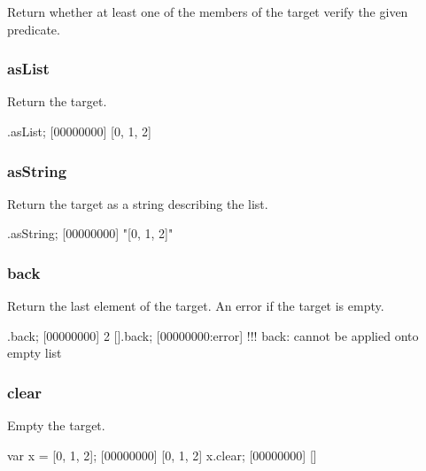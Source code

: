 Return whether at least one of the members of the target verify the
given predicate.


\subsubsection{asList}

Return the target.

\begin{urbiscript}
[0, 1, 2].asList;
[00000000] [0, 1, 2]
\end{urbiscript}

\subsubsection{asString}

Return the target as a string describing the list.

\begin{urbiscript}
[0, 1, 2].asString;
[00000000] "[0, 1, 2]"
\end{urbiscript}

\subsubsection{back}

Return the last element of the target. An error if the target is empty.

\begin{urbiscript}
[0, 1, 2].back;
[00000000] 2
[].back;
[00000000:error] !!! back: cannot be applied onto empty list
\end{urbiscript}

\subsubsection{clear}

Empty the target.

\begin{urbiscript}
var x = [0, 1, 2];
[00000000] [0, 1, 2]
x.clear;
[00000000] []
\end{urbiscript}

